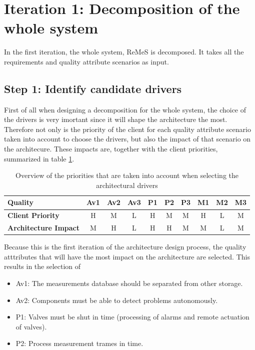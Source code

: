 \section{Iteration 1: Decomposition of the whole system}
\label{add:it1}

\npar In the first iteration, the whole system, ReMeS is decomposed. It takes
all the requirements and quality attribute scenarios as input.

\subsection{Step 1: Identify candidate drivers}
\label{add:it1/drivers}

\npar First of all when designing a decomposition for the whole system, the
choice of the drivers is very imortant since it will shape the architecture the
most. Therefore not only is the priority of the client for each quality
attribute scenario taken into account to choose the drivers, but also the impact of
that scenario on the architecure. These impacts are, together with the client
priorities, summarized in table \ref{table:add/it1/priorities}.

\begin{table}[H]
	\begin{center}
		\begin{tabular}{|l|c|c|c|c|c|c|c|c|c|}
		\hline
		\textbf{Quality}			&	Av1	&	Av2	&	Av3	&	P1	&	P2	&	P3	&	M1	&	M2	&	M3	\\
		\hline
		\textbf{Client Priority}	&	H	&	M	&	L	&	H	&	M	&	M	&	H	&	L	&	M	\\
		\hline
		\textbf{Architecture Impact}&	M	&	H	&	L	&	H	&	H	&	M	&	M	&	L	&	M	\\
		\hline
		\end{tabular}
		\caption{Overview of the priorities that are taken into account when
		selecting the architectural drivers}
		\label{table:add/it1/priorities}
	\end{center}
\end{table}

\npar Because this is the first iteration of the architecture design process,
the quality atttributes that will have the most impact on the architecture
are selected. This results in the selection of
\begin{itemize}
  	\item Av1: The measurements database should be separated from other storage. 
  	\item Av2: Components must be able to detect problems autonomously.
  	\item P1: Valves must be shut in time (processing of alarms and remote
  	actuation of valves).
  	\item P2: Process measurement trames in time. 
\end{itemize}

